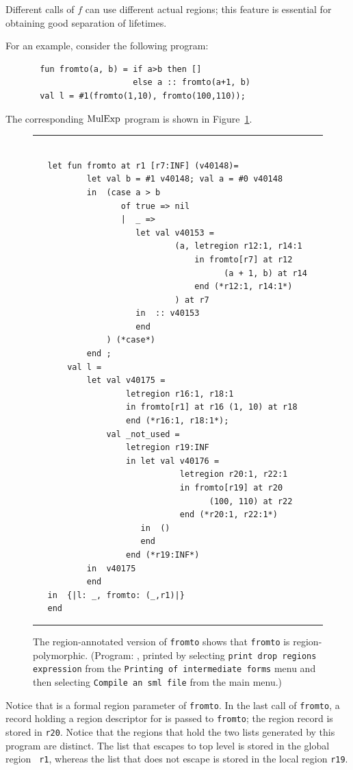 \documentclass[12pt]{book}
\begin{document}
Different calls of $f$ can use different actual regions; this feature
is essential for obtaining good separation of lifetimes.

For an example, consider the following program:
\begin{verbatim}
       fun fromto(a, b) = if a>b then []
                          else a :: fromto(a+1, b)
       val l = #1(fromto(1,10), fromto(100,110));
\end{verbatim}
The corresponding $\hbox{\rm MulExp}$ program is shown in Figure~\ref{fromto.fig}.
\begin{figure}
\hrule
\begin{verbatim}

   let fun fromto at r1 [r7:INF] (v40148)= 
           let val b = #1 v40148; val a = #0 v40148
           in  (case a > b 
                  of true => nil
                  |  _ => 
                     let val v40153 = 
                             (a, letregion r12:1, r14:1 
                                 in fromto[r7] at r12 
                                       (a + 1, b) at r14 
                                 end (*r12:1, r14:1*)
                             ) at r7
                     in  :: v40153
                     end 
               ) (*case*) 
           end ; 
       val l = 
           let val v40175 = 
                   letregion r16:1, r18:1 
                   in fromto[r1] at r16 (1, 10) at r18 
                   end (*r16:1, r18:1*); 
               val _not_used = 
                   letregion r19:INF 
                   in let val v40176 = 
                              letregion r20:1, r22:1 
                              in fromto[r19] at r20 
                                    (100, 110) at r22 
                              end (*r20:1, r22:1*)
                      in  ()
                      end  
                   end (*r19:INF*)
           in  v40175
           end 
   in  {|l: _, fromto: (_,r1)|}
   end 
\end{verbatim}
\caption{The region-annotated version of {\tt fromto} shows that {\tt fromto}
is region-polymorphic. (Program: , printed by selecting
{\tt print drop regions expression} from the {\tt Printing of intermediate forms} menu and
then selecting {\tt Compile an sml file} from the main menu.)}
\medskip

\hrule
\label{fromto.fig}
\end{figure}
Notice that  is a formal region parameter of {\tt fromto}.
In the last call of {\tt fromto}, a record holding a
region descriptor for  is passed to {\tt fromto};
the region record is stored in {\tt r20}. Notice that the regions that hold
the two lists generated by this program are distinct. 
The list that escapes to top level is stored in the global region {\tt
  r1}, whereas the list that does not escape is stored in the local
region {\tt r19}.
\end{document}
